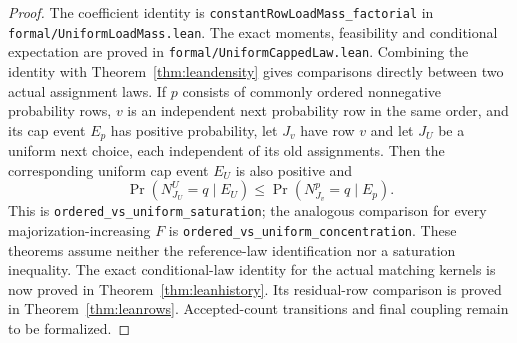 \documentclass[11pt]{article}
\begin{document}
\begin{proof}
The coefficient identity is \texttt{constantRowLoadMass\_factorial} in
\texttt{formal/UniformLoadMass.lean}. The exact moments, feasibility and
conditional expectation are proved in \texttt{formal/UniformCappedLaw.lean}.
Combining the identity with Theorem~\ref{thm:leandensity} gives comparisons
directly between two actual assignment laws. If $p$ consists of commonly
ordered nonnegative probability rows, $v$ is an independent next
probability row in the same order, and its cap event $E_p$ has positive
probability, let $J_v$ have row $v$ and let $J_U$ be a uniform next
choice, each independent of its old assignments. Then the corresponding
uniform cap event $E_U$ is also positive and
\[
 \Pr(N^U_{J_U}=q\mid E_U)
 \leq \Pr(N^p_{J_v}=q\mid E_p).
\]
This is \texttt{ordered\_vs\_uniform\_saturation}; the analogous comparison
for every majorization-increasing $F$ is
\texttt{ordered\_vs\_uniform\_concentration}. These theorems assume neither
the reference-law identification nor a saturation inequality. The exact conditional-law identity for the actual matching kernels
is now proved in Theorem~\ref{thm:leanhistory}. Its residual-row comparison
is proved in Theorem~\ref{thm:leanrows}. Accepted-count transitions and
final coupling remain to be formalized.
\end{proof}
\end{document}
